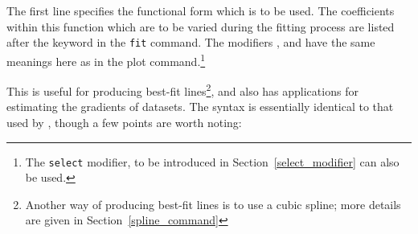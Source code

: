 The first line specifies the functional form which is to be used.  The
coefficients within this function which are to be varied during the fitting
process are listed after the keyword  in the {\tt fit} command.
The modifiers ,  and
 have the same meanings here as in the plot
command.\footnote{The {\tt select} modifier, to be introduced in
Section~\ref{select_modifier} can also be used.}

This is useful for producing best-fit lines\footnote{Another way of producing best-fit lines is to use a cubic
spline; more details are given in Section~\ref{spline_command}}, and also has
applications for estimating the gradients of datasets.  The syntax is
essentially identical to that used by \gnuplot, though a few points are worth
noting:

